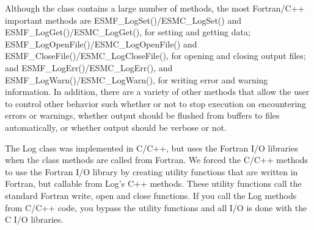 %


Although the class contains a large number of methods, the most Fortran/C++ important methods
are ESMF\_LogSet()/ESMC\_LogSet() and ESMF\_LogGet()/ESMC\_LogGet(),
for setting and getting data; ESMF\_LogOpenFile()/ESMC\_LogOpenFile() and ESMF\_CloseFile()/ESMC\_LogCloseFile(),
for opening and closing output files; and ESMF\_LogErr()/ESMC\_LogErr(), and ESMF\_LogWarn()/ESMC\_LogWarn(), for
writing error and warning information. In addition, there are
a variety of other methods that allow the user to control other behavior such whether
or not to stop execution on encountering errors or warnings, whether output
should be flushed from buffers to files automatically, or whether output should be verbose
or not. 

The Log class was implemented in C/C++, but uses the Fortran I/O libraries when
the class methods are called from Fortran. We forced the C/C++ methods 
to use the Fortran I/O library by creating 
utility functions that are written in Fortran, but callable from Log's C++ methods.
These utility functions call the standard Fortran write, open and close functions.
If you call the Log methods from C/C++ code, you bypass the utility functions
and all I/O is done with the C I/O libraries.





